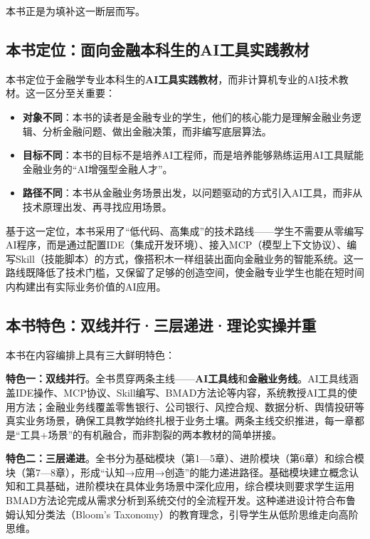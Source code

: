 本书正是为填补这一断层而写。

\subsection*{本书定位：面向金融本科生的AI工具实践教材}

本书定位于金融学专业本科生的\textbf{AI工具实践教材}，而非计算机专业的AI技术教材。这一区分至关重要：

\begin{itemize}[leftmargin=2em]
  \item \textbf{对象不同}：本书的读者是金融专业的学生，他们的核心能力是理解金融业务逻辑、分析金融问题、做出金融决策，而非编写底层算法。
  \item \textbf{目标不同}：本书的目标不是培养AI工程师，而是培养能够熟练运用AI工具赋能金融业务的``AI增强型金融人才''。
  \item \textbf{路径不同}：本书从金融业务场景出发，以问题驱动的方式引入AI工具，而非从技术原理出发、再寻找应用场景。
\end{itemize}

基于这一定位，本书采用了``低代码、高集成''的技术路线——学生不需要从零编写AI程序，而是通过配置IDE（集成开发环境）、接入MCP（模型上下文协议）、编写Skill（技能脚本）的方式，像搭积木一样组装出面向金融业务的智能系统。这一路线既降低了技术门槛，又保留了足够的创造空间，使金融专业学生也能在短时间内构建出有实际业务价值的AI应用。

\subsection*{本书特色：双线并行·三层递进·理论实操并重}

本书在内容编排上具有三大鲜明特色：

\textbf{特色一：双线并行}。全书贯穿两条主线——\textbf{AI工具线}和\textbf{金融业务线}。AI工具线涵盖IDE操作、MCP协议、Skill编写、BMAD方法论等内容，系统教授AI工具的使用方法；金融业务线覆盖零售银行、公司银行、风控合规、数据分析、舆情投研等真实业务场景，确保工具教学始终扎根于业务土壤。两条主线交织推进，每一章都是``工具+场景''的有机融合，而非割裂的两本教材的简单拼接。

\textbf{特色二：三层递进}。全书分为基础模块（第1—5章）、进阶模块（第6章）和综合模块（第7—8章），形成``认知→应用→创造''的能力递进路径。基础模块建立概念认知和工具基础，进阶模块在具体业务场景中深化应用，综合模块则要求学生运用BMAD方法论完成从需求分析到系统交付的全流程开发。这种递进设计符合布鲁姆认知分类法（Bloom's Taxonomy）的教育理念，引导学生从低阶思维走向高阶思维。

